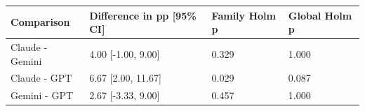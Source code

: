 \begin{tabular}{llll}
\hline
Comparison & Difference in pp [95\% CI] & Family Holm p & Global Holm p \\
\hline
Claude - Gemini & 4.00 [-1.00, 9.00] & 0.329 & 1.000 \\
Claude - GPT & 6.67 [2.00, 11.67] & 0.029 & 0.087 \\
Gemini - GPT & 2.67 [-3.33, 9.00] & 0.457 & 1.000 \\
\hline
\end{tabular}
